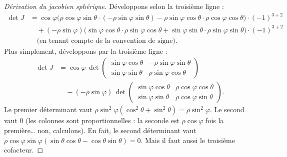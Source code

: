 \documentclass[12pt,a4paper,openany]{book}
\theoremstyle{definition}
\begin{document}
\begin{proof}[Dérivation du jacobien sphérique]
  Développons selon la troisième ligne :
  \begin{align*}
    \det J &= \cos\varphi\bigl(\rho\cos\varphi\sin\theta \cdot
    (-\rho\sin\varphi\sin\theta) -
    \rho\sin\varphi\cos\theta\cdot\rho\cos\varphi\cos\theta\bigr) \cdot(-1)^{3+2}\\
    &\quad + (-\rho\sin\varphi)\bigl(\sin\varphi\cos\theta\cdot
    \rho\sin\varphi\cos\theta + \sin\varphi\sin\theta\cdot
    \rho\sin\varphi\sin\theta\bigr)\cdot(-1)^{3+2} \\
    &\quad \text{(en tenant compte de la convention de signe)}.
  \end{align*}
  Plus simplement, développons par la troisième ligne :
  \begin{align*}
    \det J &= \cos\varphi\,
    \det\begin{pmatrix}
      \sin\varphi\cos\theta & -\rho\sin\varphi\sin\theta \\
      \sin\varphi\sin\theta & \rho\sin\varphi\cos\theta
    \end{pmatrix} \\
    &\quad - (-\rho\sin\varphi)\,
    \det\begin{pmatrix}
      \sin\varphi\cos\theta & \rho\cos\varphi\cos\theta \\
      \sin\varphi\sin\theta & \rho\cos\varphi\sin\theta
    \end{pmatrix}.
  \end{align*}
  Le premier déterminant vaut
  $\rho\sin^2\!\varphi(\cos^2\!\theta + \sin^2\!\theta) = \rho\sin^2\!\varphi$.
  Le second vaut $0$ (les colonnes sont proportionnelles : la seconde
  est $\rho\cos\varphi$ fois la première\ldots{} non, calculons).
  En fait, le second déterminant vaut
  $\rho\cos\varphi\sin\varphi(\sin\theta\cos\theta -
  \cos\theta\sin\theta)  = 0$. Mais il faut aussi le troisième cofacteur.


\end{proof}
\end{document}
